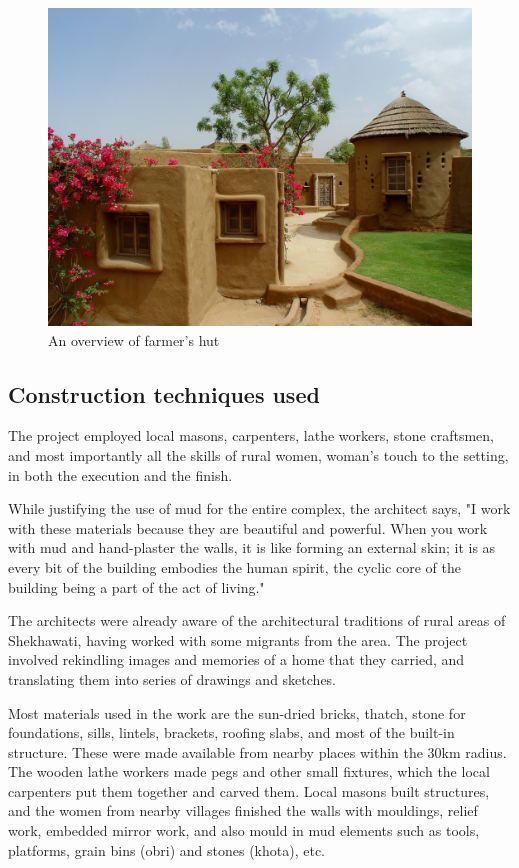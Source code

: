 \begin{figure}[H]
  \centering
  \includegraphics[angle=0,width=1.0\textwidth]{img/dc-fh}
  \caption{An overview of farmer's hut}
  \label{fig:dc-wh} 
\end{figure}


\subsection{Construction techniques used} %
\label{sub:dcm_ctu}

The project employed local masons, carpenters, lathe workers, stone craftsmen, and most importantly all the skills of rural women, woman's touch to the setting, in both the execution and the finish.

While justifying the use of mud for the entire complex, the architect says, "I work with these materials because they are beautiful and powerful. When you work with mud and hand-plaster the walls, it is like forming an external skin; it is as every bit of the building embodies the human spirit, the cyclic core of the building being a part of the act of living."

The architects were already aware of the architectural traditions of rural areas of Shekhawati, having worked with some migrants from the area. The project involved rekindling images and memories of a home that they carried, and translating them into series of drawings and sketches.

\noindent Most materials used in the work are the sun-dried bricks, thatch, stone for foundations, sills, lintels, brackets, roofing slabs, and most of the built-in structure. These were made available from nearby places within the 30km radius. The wooden lathe workers made pegs and other small fixtures, which the local carpenters put them together and carved them. Local masons built structures, and the women from nearby villages finished the walls with mouldings, relief work, embedded mirror work, and also mould in mud elements such as tools, platforms, grain bins (obri) and stones (khota), etc.

